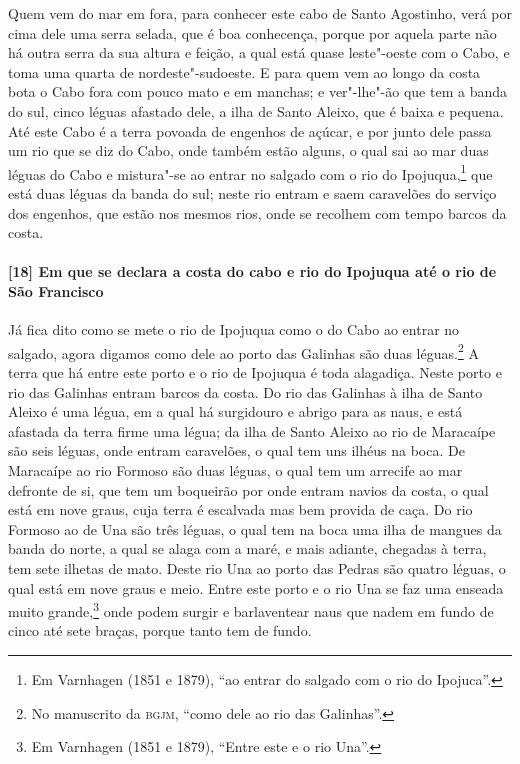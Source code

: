 \begin{linenumbers}
Quem vem do mar em fora, para conhecer este cabo de Santo Agostinho, verá por cima dele
uma serra selada, que é boa conhecença, porque por aquela parte não há outra serra da sua
altura e feição, a qual está quase leste"-oeste com o Cabo, e toma uma quarta de
nordeste"-sudoeste. E para quem vem ao longo da costa bota o Cabo fora com pouco mato e em
manchas; e ver"-lhe"-ão que tem a banda do sul, cinco léguas afastado dele, a ilha de Santo
Aleixo, que é baixa e pequena. Até este Cabo é a terra povoada de engenhos de açúcar, e
por junto dele passa um rio que se diz do Cabo, onde também estão alguns, o qual sai ao
mar duas léguas do Cabo e mistura"-se ao entrar no salgado com o rio do Ipojuqua,\footnote{
Em Varnhagen (1851 e 1879), ``ao entrar do salgado com o rio do Ipojuca''.} que está duas
léguas da banda do sul; neste rio entram e saem caravelões do serviço dos engenhos, que
estão nos mesmos rios, onde se recolhem com tempo barcos da costa.

\paragraph{[18] Em que se declara a costa do cabo e rio do Ipojuqua até o rio de São
Francisco} \quad
Já fica dito como se mete o rio de Ipojuqua como o do Cabo ao entrar no salgado, agora
digamos como dele ao porto das Galinhas são duas léguas.\footnote{ No manuscrito da
\textsc{bgjm}, ``como dele ao rio das Galinhas''.} A terra que há entre este porto e o rio
de Ipojuqua é toda alagadiça. Neste porto e rio das Galinhas entram barcos da costa. Do
rio das Galinhas à ilha de Santo Aleixo é uma légua, em a qual há surgidouro e abrigo para
as naus, e está afastada da terra firme uma légua; da ilha de Santo Aleixo ao rio de
Maracaípe são seis léguas, onde entram caravelões, o qual tem uns ilhéus na boca. De
Maracaípe ao rio Formoso são duas léguas, o qual tem um arrecife ao mar defronte de si,
que tem um boqueirão por onde entram navios da costa, o qual está em nove graus, cuja
terra é escalvada mas bem provida de caça. Do rio Formoso ao de Una são três léguas, o
qual tem na boca uma ilha de mangues da banda do norte, a qual se alaga com a maré, e mais
adiante, chegadas à terra, tem sete ilhetas de mato. Deste rio Una ao porto das Pedras são
quatro léguas, o qual está em nove graus e meio. Entre este porto e o rio Una se faz uma
enseada muito grande,\footnote{ Em Varnhagen (1851 e 1879), ``Entre este e o rio Una''.}
onde podem surgir e barlaventear naus que nadem em fundo de cinco até sete braças, porque
tanto tem de fundo.


\end{linenumbers}
